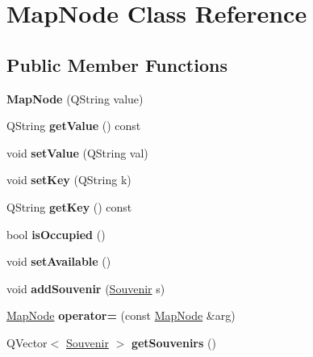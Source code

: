 \hypertarget{class_map_node}{}\section{Map\+Node Class Reference}
\label{class_map_node}
\subsection*{Public Member Functions}
\begin{DoxyCompactItemize}
\item 
\mbox{\label{class_map_node_ab17429369aa016758d8019cb6d711f89}} 
{\bfseries Map\+Node} (Q\+String value)
\item 
\mbox{\label{class_map_node_a37c08b0ef2914ee3192cf8b4ced0a73c}} 
Q\+String {\bfseries get\+Value} () const
\item 
\mbox{\label{class_map_node_a8e0e044b760aa71c6e8ab4b437d00bc2}} 
void {\bfseries set\+Value} (Q\+String val)
\item 
\mbox{\label{class_map_node_af3732a07deb8c0c2479dc692c7dc5925}} 
void {\bfseries set\+Key} (Q\+String k)
\item 
\mbox{\label{class_map_node_a89e08f984169029557f0a1d55c9589a0}} 
Q\+String {\bfseries get\+Key} () const
\item 
\mbox{\label{class_map_node_a38667f219cc961d05f1b1dbe992f6419}} 
bool {\bfseries is\+Occupied} ()
\item 
\mbox{\label{class_map_node_a0b540119ef1bb56b08a7e78b18423d81}} 
void {\bfseries set\+Available} ()
\item 
\mbox{\label{class_map_node_a18d7e869ab2b41b195468a51f773ed74}} 
void {\bfseries add\+Souvenir} (\hyperlink{class_souvenir}{Souvenir} s)
\item 
\mbox{\label{class_map_node_a93399ff797254eb384d3980d9703fd14}} 
\hyperlink{class_map_node}{Map\+Node} {\bfseries operator=} (const \hyperlink{class_map_node}{Map\+Node} \&arg)
\item 
\mbox{\label{class_map_node_a5b944284ebea6e3d2fe12f6703ad20d6}} 
Q\+Vector$<$ \hyperlink{class_souvenir}{Souvenir} $>$ {\bfseries get\+Souvenirs} ()
\end{DoxyCompactItemize}
